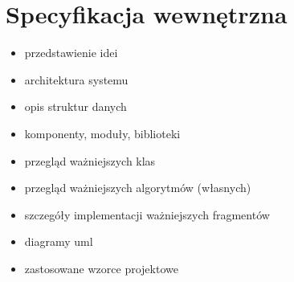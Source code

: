 \chapter{Specyfikacja wewnętrzna} 
{
    \begin{itemize}
        \item przedstawienie idei
        \item architektura systemu
        \item opis struktur danych
        \item komponenty, moduły, biblioteki
        \item przegląd ważniejszych klas
        \item przegląd ważniejszych algorytmów (własnych)
        \item szczegóły implementacji ważniejszych fragmentów
        \item diagramy uml
        \item zastosowane wzorce projektowe
    \end{itemize}
}